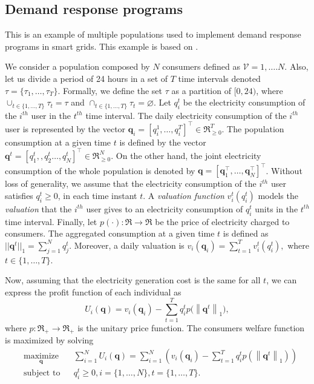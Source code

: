 \documentclass[a4paper,10pt]{article}
\def\th{^{th}}
\newcommand{\bs}[1]{\boldsymbol{#1}}
\def\th{^{th}}
\newcommand{\norm}[1]{\left\lVert#1\right\rVert}
\begin{document}
\newpage
\subsection{Demand response programs}

This is an example of multiple populations used to implement demand response programs in smart grids. 
This example is based on \cite{barreto2013design, barreto2014incentives}.



We consider a population composed by $N$ consumers defined as $\mathcal{V} = {1,\ldots.N}$. Also, let us divide a period of 24 hours in a set of $T$ time intervals denoted $\tau = \{\tau_1,\ldots,\tau_T\}$.
Formally, we define the set $\tau$ as a partition of $[0,24)$, where 
 $\cup_{t\in\{1,\ldots,T\}} \tau_t = \tau$ and $\cap_{t\in\{1,\ldots,T\}} \tau_t = \varnothing$.
%
Let $q_i^t$ be the electricity consumption of the $i\th$ user in the $t\th$ time interval. 
The daily electricity consumption of the $i\th$ user is represented by the vector $\bs{q}_i=[q_i^1,\ldots,q_i^T]^\top\in \Re_{\geq 0}^{T}$.
The population consumption at a given time $t$ is defined by the vector $\bs{q}^t = [q_1^t,, q_2^t\ldots,q_N^t]^\top\in \Re_{\geq 0}^{N}$.
On the other hand, the joint electricity consumption of the whole population is denoted by $\bs{q} = [\bs{q}_1^\top,
\ldots, \bs{q}_N^\top]^\top$. 
Without loss of generality, we assume that the electricity consumption of the $i\th$ user  satisfies $q_i^t\geq 0$,  in each time instant $t$.
A \emph{valuation function} $v_i^t(q_i^t)$ models the \emph{valuation} that the $i\th$ user gives to an electricity consumption of $q_i^t$ units in the $t\th$ time interval. Finally, let $p(\cdot):\Re\rightarrow\Re$ be the price of electricity charged to consumers. The aggregated consumption at a given time $t$ is defined as $||\bs{q}^t||_1 = \sum_{j=1}^N q_j^t$.
Moreover, a daily valuation is 
$v_i(\bs{q}_i)=\sum_{t=1}^T v_i^t(q_i^t),$
 where $t\in\{1,\ldots,T\}$.


 
 
 
Now, assuming  that the electricity generation cost is  the same for all $t$, we can express the profit function of each individual as
%
\begin{equation}\label{eq:u_i_}
 U_i(\bs{q}) = v_i(\bs{q}_i) - \sum_{t=1}^T q_i^t p\Big( \norm{\bs{q}^t}_1 \Big),
\end{equation}
%
where 
$p:\Re_+ \to \Re_+$ is the unitary price function.
The consumers welfare function is maximized by solving \cite{Johari09}
%
\begin{equation}\label{eq:opt_problem}
\begin{aligned}
& \underset{\bs{q}}{\text{maximize}}
& &  \sum_{i=1}^N U_i(\bs{q}) =  \sum_{i=1}^N\left( v_i(\bs{q}_i) - \sum_{t=1}^T q_i^t p\left( \norm{\bs{q}^t}_1 \right) \right) \\
& \text{subject to}
& & q_i^t \geq 0,  i =\{1,\ldots,N\}, t =\{1,\ldots,T\}.
\end{aligned}
\end{equation}
\end{document}
